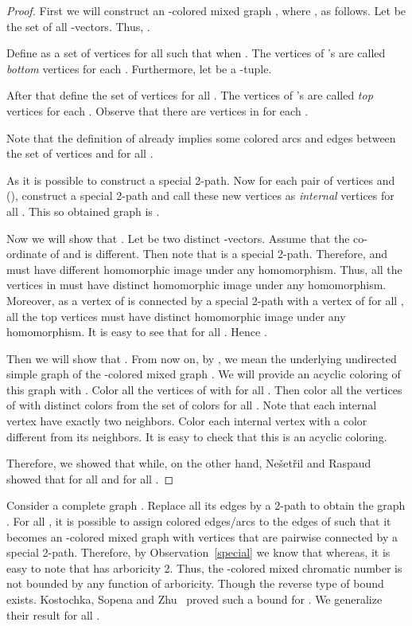 \documentclass[11pt]{article}
\begin{document}
\begin{proof}
First we will construct an -colored mixed graph , where , as follows. 
Let  be the set of all -vectors. 
Thus, .  

Define  as a set of  vertices  for all  such that  when . The vertices of 's are called \textit{bottom} vertices for each .
Furthermore, let  be a -tuple.  

After that define the set of  vertices  
for all .  
The vertices of 's are called \textit{top} vertices for each . 
Observe that there are  vertices in  for each .

Note that the definition of  already implies some colored arcs and edges between the set of vertices 
 and  for all   . 


As  it is possible to construct a special 2-path. 
Now for each  pair of vertices  and  (), construct a special 2-path  and  call these new vertices  as 
\textit{internal} vertices for all .
This so obtained graph is .

Now we will show that . 
Let  be two distinct 
-vectors. 
Assume that the  co-ordinate of  and   is different. 
Then note that  is a special 2-path. 
Therefore,  and  must have different homomorphic image under any homomorphism. 
Thus, all the vertices in  must have distinct homomorphic image under any homomorphism. 
Moreover, as a vertex of  is connected by a special 2-path with a vertex of  for all , all the top vertices must have distinct 
homomorphic image under any homomorphism. It is easy to see that  for all   .
Hence .


 Then we will show that . From now on, by , we mean the underlying undirected simple graph of the 
 -colored mixed graph . We will provide an acyclic coloring of this graph with .
 Color all the vertices of  with  for all . Then color all the vertices of  with distinct  colors 
 from the set  of colors for all .
Note that each internal vertex have exactly two neighbors. Color each internal vertex with a color different from its neighbors.
It is easy to check that this is an acyclic coloring. 

Therefore, we showed that  
while, on the other hand, Ne\v{s}et\v{r}il and Raspaud~\cite{raspaud_and_nesetril} showed that  for all  and for all . 
  \end{proof}



Consider a complete graph  . Replace all its edges  by a 2-path to obtain the graph . 
For all , it is possible to assign colored edges/arcs to 
the edges of  such that it becomes an -colored mixed graph with  vertices that are pairwise connected by 
a special 2-path. Therefore, by Observation~\ref{special} we know that  whereas, it is easy to note that  has arboricity 2. 
Thus, the -colored mixed chromatic number  is not bounded by any function of arboricity.
Though the reverse type of bound exists. Kostochka, Sopena and Zhu~\cite{Kostochka97acyclicand}  proved such a bound for . We generalize their result for all . 
\end{document}
